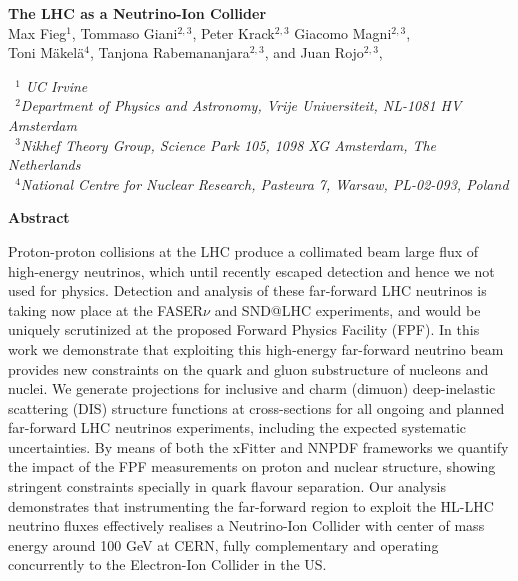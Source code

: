 \documentclass[11pt,a4paper]{article}
\numberwithin{equation}{section}
\numberwithin{figure}{section}
\numberwithin{table}{section}
\begin{document}

\vspace{0.7cm}

\begin{center}
  {\Large \bf The LHC as a Neutrino-Ion Collider }\\
  \vspace{1.1cm}
  {\small
Max Fieg$^{1}$, Tommaso Giani$^{2,3}$, Peter Krack$^{2,3}$  Giacomo Magni$^{2,3}$, \\[0.1cm] Toni M\"akel\"a$^{4}$,
    Tanjona Rabemananjara$^{2,3}$, and Juan Rojo$^{2,3}$, 
  }\\
  
\vspace{0.7cm}

{\it \small
    ~$^1$ UC Irvine  \\[0.1cm]
    ~$^2$Department of Physics and Astronomy, Vrije Universiteit, NL-1081 HV Amsterdam\\[0.1cm]
    ~$^3$Nikhef Theory Group, Science Park 105, 1098 XG Amsterdam, The Netherlands\\[0.1cm]
    ~$^4$National Centre for Nuclear Research, Pasteura 7, Warsaw, PL-02-093, Poland \\[0.1cm]
 }


\vspace{1.0cm}

{\bf \large Abstract}

\end{center}

Proton-proton collisions at the LHC produce a collimated beam large flux of high-energy neutrinos,
which until recently escaped detection and hence we not used for physics.
%
Detection and analysis of these far-forward LHC neutrinos is taking now place at the
FASER$\nu$ and SND@LHC experiments, and would be uniquely scrutinized
at the proposed Forward Physics Facility (FPF).
%
In this work we demonstrate that exploiting this high-energy far-forward neutrino beam
provides new constraints on the quark and gluon substructure of nucleons and nuclei.
%
We generate projections for inclusive and charm (dimuon)
deep-inelastic scattering (DIS) structure functions
at cross-sections for all ongoing and planned far-forward LHC neutrinos experiments,
including the expected systematic uncertainties.
%
By means of both the xFitter and NNPDF frameworks we quantify the impact of the FPF
measurements on proton and nuclear structure, showing stringent constraints specially
in quark flavour separation.
%
Our analysis demonstrates that instrumenting the far-forward region to exploit the HL-LHC
neutrino fluxes effectively realises a  Neutrino-Ion Collider with
center of mass  energy around 100 GeV at CERN, fully complementary
and operating concurrently to the
Electron-Ion Collider in the US.
\end{document}
